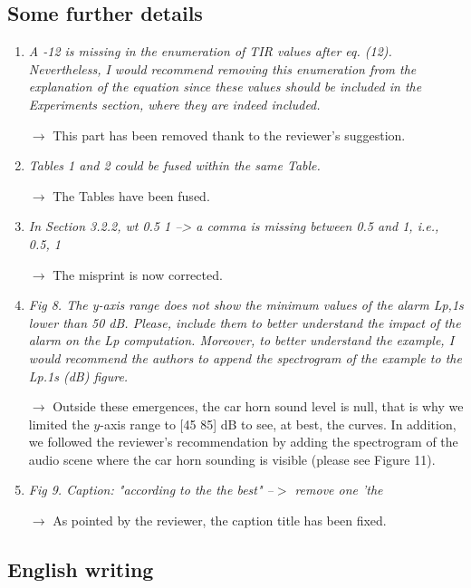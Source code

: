 \documentclass[10pt]{article}
\begin{document}
\subsection{Some further details}

\begin{enumerate}
\item \emph{A -12 is missing in the enumeration of TIR values after eq. (12). Nevertheless, I would recommend removing this enumeration from the explanation of the equation since these values should be included in the Experiments section, where they are indeed included.}

$\rightarrow$ This part has been removed thank to the reviewer's suggestion.

\item \emph{Tables 1 and 2 could be fused within the same Table.}

$\rightarrow$ The Tables have been fused.

\item \emph{In Section 3.2.2, wt {0.5 1} --> a comma is missing between 0.5 and 1, i.e., {0.5, 1} }

$\rightarrow$ The misprint is now corrected.

\item \emph{Fig 8. The y-axis range does not show the minimum values of the alarm Lp,1s lower than 50 dB. Please, include them to better understand the impact of the alarm on the Lp computation. Moreover, to better understand the example, I would recommend the authors to append the spectrogram of the example to the Lp.1s (dB) figure.}

$\rightarrow$ Outside these emergences, the car horn sound level is null, that is why we limited the $y$-axis range to [45 85] dB to see, at best, the curves. In addition, we followed the reviewer's recommendation by adding the spectrogram of the audio scene where the car horn sounding is visible (please see Figure 11).

\item \emph{Fig 9. Caption: "according to the the best" --$>$ remove one 'the}

$\rightarrow$ As pointed by the reviewer, the caption title has been fixed.

\end{enumerate}
\subsection{English writing}
\end{document}
